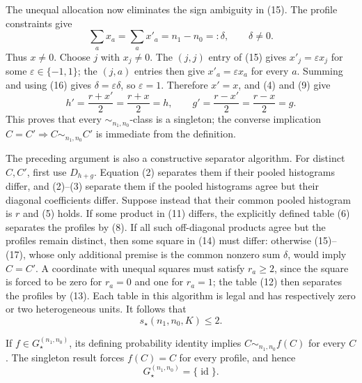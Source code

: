 The unequal allocation now eliminates the sign ambiguity in (15).  The profile constraints give
\[
 \sum_a x_a=\sum_a x'_a=n_1-n_0=:\delta,
 \qquad \delta\neq0.
 \tag{16}
\]
Thus \(x\neq0\).  Choose \(j\) with \(x_j\neq0\).  The \((j,j)\) entry of (15) gives \(x'_j=\varepsilon x_j\) for some \(\varepsilon\in\{-1,1\}\); the \((j,a)\) entries then give \(x'_a=\varepsilon x_a\) for every \(a\).  Summing and using (16) gives \(\delta=\varepsilon\delta\), so \(\varepsilon=1\).  Therefore \(x'=x\), and (4) and (9) give
\[
 h'=\frac{r+x'}2=\frac{r+x}2=h,
 \qquad
 g'=\frac{r-x'}2=\frac{r-x}2=g.
 \tag{17}
\]
This proves that every \(\sim_{n_1,n_0}\)-class is a singleton; the converse implication \(C=C'\Rightarrow C\sim_{n_1,n_0}C'\) is immediate from the definition.

The preceding argument is also a constructive separator algorithm.  For distinct \(C,C'\), first use \(D_{h+g}\).  Equation (2) separates them if their pooled histograms differ, and (2)--(3) separate them if the pooled histograms agree but their diagonal coefficients differ.  Suppose instead that their common pooled histogram is \(r\) and (5) holds.  If some product in (11) differs, the explicitly defined table (6) separates the profiles by (8).  If all such off-diagonal products agree but the profiles remain distinct, then some square in (14) must differ: otherwise (15)--(17), whose only additional premise is the common nonzero sum \(\delta\), would imply \(C=C'\).  A coordinate with unequal squares must satisfy \(r_a\geq2\), since the square is forced to be zero for \(r_a=0\) and one for \(r_a=1\); the table (12) then separates the profiles by (13).  Each table in this algorithm is legal and has respectively zero or two heterogeneous units.  It follows that
\[
 s_\star(n_1,n_0,K)\leq2.
 \tag{18}
\]

If \(f\in G_\star^{(n_1,n_0)}\), its defining probability identity implies \(C\sim_{n_1,n_0}f(C)\) for every \(C\).  The singleton result forces \(f(C)=C\) for every profile, and hence
\[
 G_\star^{(n_1,n_0)}=\{\operatorname{id}\}.
 \tag{19}
\]

